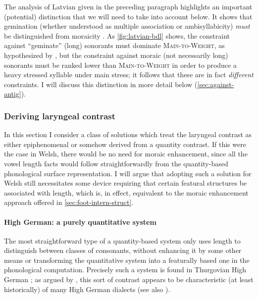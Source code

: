 The analysis of Latvian given in the preceding paragraph highlights an important (potential) distinction that we will need to take into account below. It shows that gemination (whether understood as multiple association or ambisyllabicity) \emph{must} be distinguished from moraicity \citep{selkirk90,ringen11:_gemin}. As \cref{fig:latvian-bdl} shows, the constraint against \enquote{geminate} (long) sonorants must dominate \textsc{Main\hyp to\hyp Weight}, as hypothesized by \citet{bye08}, but the constraint against moraic (not necessarily long) sonorants must be ranked lower than \textsc{Main\hyp to\hyp Weight} in order to produce a heavy stressed syllable under main stress; it follows that these are in fact \emph{different} constraints. I will discuss this distinction in more detail below (\cref{sec:against-antig}).

\subsubsection{Deriving laryngeal contrast}
\label{sec:deriv-laryng-contr}

In this section I consider a class of solutions which treat the laryngeal contrast as either epiphenomenal or somehow derived from a quantity contrast. If this were the case in Welsh, there would be no need for moraic enhancement, since all the vowel length facts would follow straightforwardly from the quantity\hyp based phonological surface representation. I will argue that adopting such a solution for Welsh still necessitates some device requiring that certain featural structures be associated with length, which is, in effect, equivalent to the moraic enhancement approach offered in \cref{sec:foot-intern-struct}.

\paragraph{High German: a purely quantitative system}
\label{sec:high-german}

The most straightforward type of a quantity\hyp based system only uses length to distinguish between classes of consonants, without enhancing it by some other means or transforming the quantitative system into a featurally based one in the phonological computation. Precisely such a system is found in Thurgovian High German \citep{kraehenmann01:_swiss_german,kraehenmann03:_quant_aleman,kraehenmann08:_durat_swiss_german}; as argued by \citet{seiler09:_sound}, this sort of contrast appears to be characteristic (at least historically) of many High German dialects (see also \citealt{lahiri04}).

